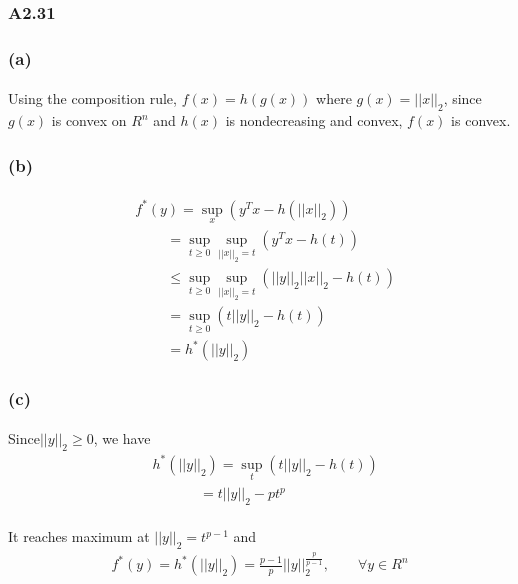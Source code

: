 \subsubsection*{A2.31}
\subsubsection*{(a)}
\paragraph{}
Using the composition rule, $f(x) =h(g(x))$ where $g(x)=||x||_2$, since $g(x)$ is convex on $R^n$ and $h(x)$ is nondecreasing and convex, $f(x)$ is convex.
\subsubsection*{(b)}
\paragraph{}
\begin{align*}
& f^{\ast}(y) = \sup_x(y^Tx -h(||x||_2))\\ 
&\qquad\ =\sup_{t\geq 0} \sup_{||x||_2 = t}(y^Tx - h(t)) \\ 
&\qquad\ \leq\sup_{t\geq 0} \sup_{||x||_2 = t}(||y||_2||x||_2 - h(t)) \\
&\qquad\ = \sup_{t\geq 0}(t||y||_2 - h(t)) \\
&\qquad\ = h^{\ast}(||y||_2)
\end{align*}
\subsubsection*{(c)}
\paragraph{}
Since$||y||_2 \geq 0$, we have
\begin{align*}
&h^{\ast}(||y||_2) =\sup_{t} (t||y||_2 - h(t)) \\
&\qquad \ \ \ \ \ \ = t||y||_2 - pt^p
\end{align*}
\paragraph{}
It reaches maximum at $||y||_2 = t^{p-1}$ and
\begin{align*}
f^{\ast}(y) = h^{\ast}(||y||_2) = \frac{p-1}{p}||y||_2^{\frac{p}{p-1}}, \qquad \forall y \in R^n
\end{align*}

